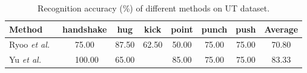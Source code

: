 \documentclass[9pt,journal,letterpaper,twocolumn]{IEEEtran}
\begin{document}
		\begin{table}[!t]
		\caption{Recognition  accuracy (\%) of different methods on UT dataset.}
		\vspace{-3mm}
		{\scriptsize
			\begin{center}
				\begin{tabular}{lc cc cccc}
					\hline\hline
					\centering
					\hspace{-0.5em}Method & \hspace{-0.5em}handshake\hspace{-0.5em} & \hspace{-0.5em}hug\hspace{-0.5em} & \hspace{-0.5em}kick\hspace{-0.5em} & \hspace{-0.5em}point\hspace{-0.5em} & \hspace{-0.5em}punch\hspace{-0.5em} & \hspace{-0.5em}push\hspace{-0.5em} & \hspace{-0.5em}Average\hspace{-0.5em}  \\
					\hline
					\hspace{-0.5em}Ryoo {\em et al.}~\cite{ryoo2009spatio} & \hspace{-0.5em}75.00\hspace{-0.5em} & \hspace{-0.5em}87.50\hspace{-0.5em} & \hspace{-0.5em}62.50\hspace{-0.5em} & \hspace{-0.5em}50.00\hspace{-0.5em} & \hspace{-0.5em}75.00\hspace{-0.5em} & \hspace{-0.5em}75.00\hspace{-0.5em} & \hspace{-0.5em}70.80\hspace{-0.5em}  \\
					\hspace{-0.5em}Yu {\em et al.}~\cite{yu2010real} & \hspace{-0.5em}~100.00\hspace{-0.5em}& \hspace{-0.5em}65.00\hspace{-0.5em}& \hspace{-0.5em}{100.00}\hspace{-0.5em} & \hspace{-0.5em}85.00\hspace{-0.5em}& \hspace{-0.5em}75.00\hspace{-0.5em}& \hspace{-0.5em}75.00\hspace{-0.5em}& \hspace{-0.5em}83.33\hspace{-0.5em} \\

\end{tabular}
\end{center}}
\end{table}
\end{document}
